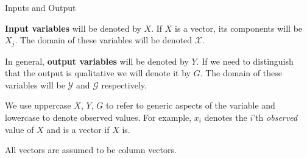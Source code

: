 \documentclass[10pt, handout]{beamer}
\begin{document}
\begin{frame}[fragile]{Inputs and Output}
\begin{center}
\end{center}

\textbf{Input variables} will be denoted by $X$. If $X$ is a vector, its components will be $X_j$. The domain of these variables will be denoted $\mathcal{X}$. 

In general, \textbf{output variables} will be denoted by $Y$. If we need to distinguish that the output is qualitative we will denote it by $G$. The domain of these variables will be $\mathcal{Y}$ and $\mathcal{G}$ respectively. 

We use uppercase $X$, $Y$, $G$ to refer to generic aspects of the variable and lowercase to denote observed values. For example, $x_i$ denotes the $i$'th \textit{observed} value of $X$ and is a vector if $X$ is. 

All vectors are assumed to be column vectors.
\end{frame}
\end{document}
